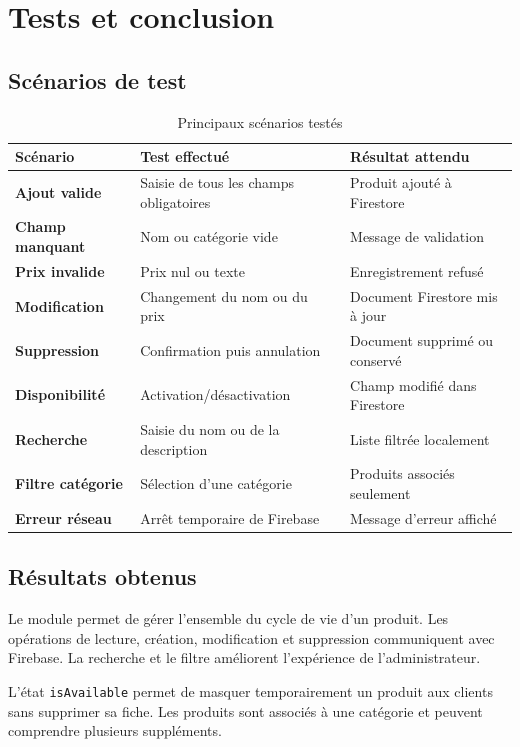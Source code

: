 \documentclass[12pt,a4paper]{report}
\begin{document}
\chapter{Tests et conclusion}

\section{Scénarios de test}

\begin{table}[H]
\centering
\caption{Principaux scénarios testés}
\begin{tabularx}{\textwidth}{>{\bfseries}p{2.8cm}p{4.5cm}X}
\toprule
Scénario & Test effectué & Résultat attendu \\
\midrule
Ajout valide & Saisie de tous les champs obligatoires & Produit ajouté à Firestore \\
Champ manquant & Nom ou catégorie vide & Message de validation \\
Prix invalide & Prix nul ou texte & Enregistrement refusé \\
Modification & Changement du nom ou du prix & Document Firestore mis à jour \\
Suppression & Confirmation puis annulation & Document supprimé ou conservé \\
Disponibilité & Activation/désactivation & Champ modifié dans Firestore \\
Recherche & Saisie du nom ou de la description & Liste filtrée localement \\
Filtre catégorie & Sélection d'une catégorie & Produits associés seulement \\
Erreur réseau & Arrêt temporaire de Firebase & Message d'erreur affiché \\
\bottomrule
\end{tabularx}
\end{table}

\section{Résultats obtenus}

Le module permet de gérer l'ensemble du cycle de vie d'un produit. Les opérations
de lecture, création, modification et suppression communiquent avec Firebase.
La recherche et le filtre améliorent l'expérience de l'administrateur.

L'état \texttt{isAvailable} permet de masquer temporairement un produit aux clients
sans supprimer sa fiche. Les produits sont associés à une catégorie et peuvent
comprendre plusieurs suppléments.
\end{document}
